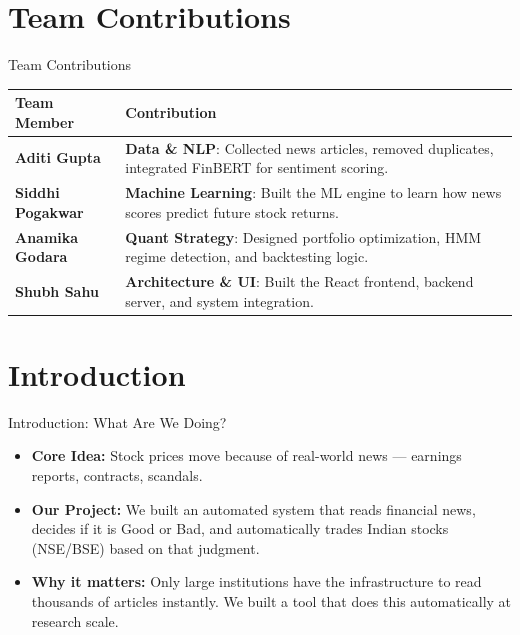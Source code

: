 \documentclass[aspectratio=169, 10pt]{beamer}
\begin{document}
\section{Team Contributions}
\begin{frame}{Team Contributions}
    \small
    \begin{table}[]
        \centering
        \renewcommand{\arraystretch}{1.4}
        \begin{tabular}{@{}p{2.8cm} p{10.5cm}@{}}
        \toprule
        \textbf{Team Member} & \textbf{Contribution} \\ \midrule
        \textbf{Aditi Gupta}     & \textbf{Data \& NLP}: Collected news articles, removed duplicates, integrated FinBERT for sentiment scoring. \\
        \textbf{Siddhi Pogakwar} & \textbf{Machine Learning}: Built the ML engine to learn how news scores predict future stock returns. \\
        \textbf{Anamika Godara}  & \textbf{Quant Strategy}: Designed portfolio optimization, HMM regime detection, and backtesting logic. \\
        \textbf{Shubh Sahu}      & \textbf{Architecture \& UI}: Built the React frontend, backend server, and system integration. \\ \bottomrule
        \end{tabular}
    \end{table}
\end{frame}

\section{Introduction}
\begin{frame}{Introduction: What Are We Doing?}
    \begin{itemize}
        \item \textbf{Core Idea:} Stock prices move because of real-world news — earnings reports, contracts, scandals.
        \item \textbf{Our Project:} We built an automated system that reads financial news, decides if it is Good or Bad, and automatically trades Indian stocks (NSE/BSE) based on that judgment.
        \item \textbf{Why it matters:} Only large institutions have the infrastructure to read thousands of articles instantly. We built a tool that does this automatically at research scale.
    \end{itemize}
\end{frame}
\end{document}
